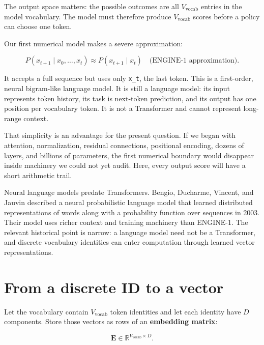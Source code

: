 The output space matters: the possible outcomes are all
\(V_{\mathrm{vocab}}\) entries in the model vocabulary. The model must
therefore produce \(V_{\mathrm{vocab}}\) scores before a policy can
choose one token.

Our first numerical model makes a severe approximation:

\begin{equation}
P\!\left(x_{t+1}\mid x_0,\ldots,x_t\right)
\approx P\!\left(x_{t+1}\mid x_t\right)
\quad\text{(ENGINE-1 approximation).}
\end{equation}

It accepts a full sequence but uses only \texttt{x\_t}, the last token.
This is a first-order, neural bigram-like language model. It is still a
language model: its input represents token history, its task is
next-token prediction, and its output has one position per vocabulary
token. It is not a Transformer and cannot represent long-range context.

That simplicity is an advantage for the present question. If we began
with attention, normalization, residual connections, positional
encoding, dozens of layers, and billions of parameters, the first
numerical boundary would disappear inside machinery we could not yet
audit. Here, every output score will have a short arithmetic trail.

Neural language models predate Transformers. Bengio, Ducharme, Vincent,
and Jauvin described a neural probabilistic language model that learned
distributed representations of words along with a probability function
over sequences in 2003. Their model uses richer context and training
machinery than ENGINE-1. The relevant historical point is narrow: a
language model need not be a Transformer, and discrete vocabulary
identities can enter computation through learned vector representations.

\section{From a discrete ID to a
vector}\label{from-a-discrete-id-to-a-vector}

Let the vocabulary contain \(V_{\mathrm{vocab}}\) token identities and
let each identity have \(D\) components. Store those vectors as rows of
an \textbf{embedding matrix}:

\begin{equation}
\mathbf{E}\in\mathbb{R}^{V_{\mathrm{vocab}}\times D}.
\end{equation}

